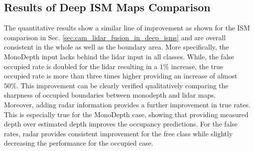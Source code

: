 \subsection{Results of Deep ISM Maps Comparison}
\label{subsec:results_analyze_deep_ism_maps_diff_sensors}
The quantitative results show a similar line of improvement as shown for the ISM comparison in Sec. \ref{sec:cam_lidar_fusion_in_deep_isms} and are overall consistent in the whole as well as the boundary area. More specifically, the MonoDepth input lacks behind the lidar input in all classes. While, the false occupied rate is doubled for the lidar resulting in a $1\%$ increase, the true occupied rate is more than three times higher providing an increase of almost $50\%$. This improvement can be clearly verified qualitatively comparing the sharpness of occupied boundaries between \gls{monodepth} and lidar maps.\\
Moreover, adding radar information provides a further improvement in true rates. This is especially true for the MonoDepth case, showing that providing measured depth over estimated depth improves the occupancy predictions. For the false rates, radar provides consistent improvement for the free class while slightly decreasing the performance for the occupied case.
 
